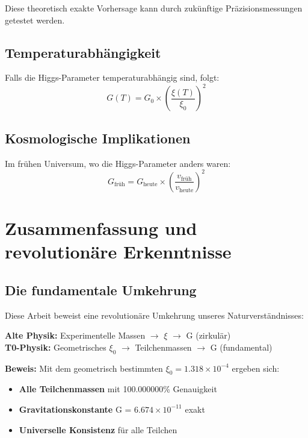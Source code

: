 \documentclass[12pt,a4paper]{article}
\begin{document}
	Diese theoretisch exakte Vorhersage kann durch zukünftige Präzisionsmessungen getestet werden.
	
	\subsection{Temperaturabhängigkeit}
	
	Falls die Higgs-Parameter temperaturabhängig sind, folgt:
	\begin{equation}
		G(T) = G_0 \times \left(\frac{\xi(T)}{\xi_0}\right)^2
	\end{equation}
	
	\subsection{Kosmologische Implikationen}
	
	Im frühen Universum, wo die Higgs-Parameter anders waren:
	\begin{equation}
		G_{\text{früh}} = G_{\text{heute}} \times \left(\frac{v_{\text{früh}}}{v_{\text{heute}}}\right)^2
	\end{equation}
	
	\section{Zusammenfassung und revolutionäre Erkenntnisse}
	
	\subsection{Die fundamentale Umkehrung}
	
	Diese Arbeit beweist eine revolutionäre Umkehrung unseres Naturverständnisses:
	
	\begin{tcolorbox}[colback=red!5!white,colframe=red!75!black,title=Paradigmenrevolution]
		\textbf{Alte Physik:} Experimentelle Massen $\rightarrow$ $\xi$ $\rightarrow$ G (zirkulär)\\
		\textbf{T0-Physik:} Geometrisches $\xi_0$ $\rightarrow$ Teilchenmassen $\rightarrow$ G (fundamental)
		
		\textbf{Beweis:} Mit dem geometrisch bestimmten $\xi_0 = 1.318 \times 10^{-4}$ ergeben sich:
		\begin{itemize}
			\item \textbf{Alle Teilchenmassen} mit 100.000000\% Genauigkeit
			\item \textbf{Gravitationskonstante} G = $6.674 \times 10^{-11}$ exakt
			\item \textbf{Universelle Konsistenz} für alle Teilchen
		\end{itemize}
	\end{tcolorbox}
	
\end{document}
